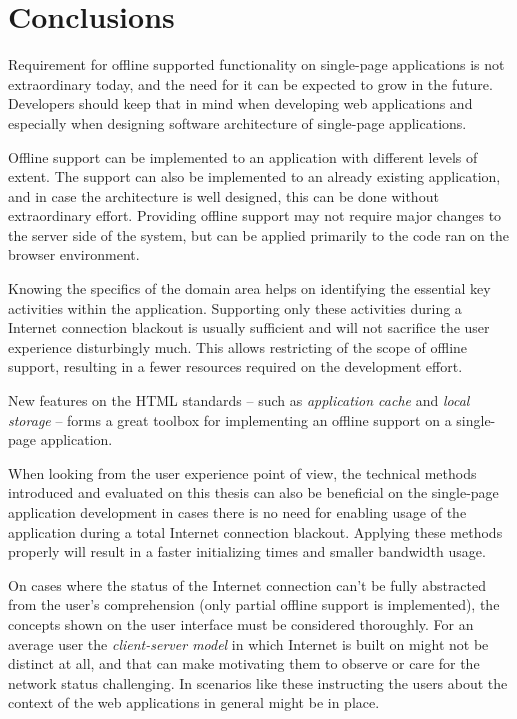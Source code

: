 
\chapter{Conclusions}

Requirement for offline supported functionality on single-page applications is not extraordinary today, and the need for it can be expected to grow in the future. Developers should keep that in mind when developing web applications and especially when designing software architecture of single-page applications.

Offline support can be implemented to an application with different levels of extent. The support can also be implemented to an already existing application, and in case the architecture is well designed, this can be done without extraordinary effort. Providing offline support may not require major changes to the server side of the system, but can be applied primarily to the code ran on the browser environment.

Knowing the specifics of the domain area helps on identifying the essential key activities within the application. Supporting only these activities during a Internet connection blackout is usually sufficient and will not sacrifice the user experience disturbingly much. This allows restricting of the scope of offline support, resulting in a fewer resources required on the development effort.

New features on the HTML standards – such as \textit{application cache} and \textit{local storage} – forms a great toolbox for implementing an offline support on a single-page application.

When looking from the user experience point of view, the technical methods introduced and evaluated on this thesis can also be beneficial on the single-page application development in cases there is no need for enabling usage of the application during a total Internet connection blackout. Applying these methods properly will result in a faster initializing times and smaller bandwidth usage.

On cases where the status of the Internet connection can't be fully abstracted from the user's comprehension (only partial offline support is implemented), the concepts shown on the user interface must be considered thoroughly. For an average user the \textit{client-server model} in which Internet is built on might not be distinct at all, and that can make motivating them to observe or care for the network status challenging. In scenarios like these instructing the users about the context of the web applications in general might be in place.


